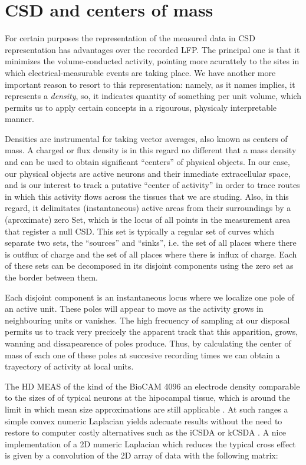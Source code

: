 \documentclass{article}
\begin{document}
\section{CSD and centers of mass}


For certain purposes the representation of the measured data in CSD
representation has advantages over the recorded LFP. The principal one is
that it minimizes the volume-conducted activity, pointing more acurattely
to the sites in which electrical-measurable events are taking place. We have
another more important reason to resort to this representation: namely,
as it names implies, it represents a \emph{density}, so, it indicates
quantity of something per unit volume, which permits us to apply certain
concepts in a rigourous, physicaly interpretable manner.

Densities are instrumental for taking vector averages, also known as centers
of mass. A charged or flux density is in this regard no different that a
mass density and can be used to obtain significant ``centers'' of
physical objects. In our case, our physical objects are active neurons and
their inmediate extracellular space, and is our interest to track a
putative ``center of activity'' in order to trace routes in which this
activity flows across the tissues that we are studing. Also, in this regard,
it delimitates (instantaneous) active areas from their surroundings by
a (aproximate) zero Set, which is the locus of all points in the measurement
area that register a null CSD. This set is typically a regular set of
curves which separate two sets, the ``sources'' and ``sinks'', i.e. the
set of all places where there is outflux of charge and the set of all places
where there is influx of charge. Each of these sets can be decomposed in
its disjoint components using the zero set as the border between them.

Each disjoint component is an instantaneous locus where we localize one pole of
an active unit. These poles will appear to move as the activity grows in neighbouring
units or vanishes. The high frecuency of sampling at our disposal permits us to
track very precicely the apparent track that this apparition, grows, wanning and
dissapearence of poles produce. Thus, by calculating the center of mass of
each one of these poles at succesive recording times
we can obtain a trayectory of activity at local units. 


The HD MEAS of the kind of the BioCAM 4096  an electrode density comparable
to the sizes of of typical neurons at the hipocampal tissue, which is around
the limit in which mean size approximations are still applicable \cite{Bedard2011}.
At such ranges a simple convex numeric Laplacian yields adecuate results without
the need to restore to computer costly alternatives such as the iCSDA or kCSDA
\cite{Leski2011, Potworowsky2011}. A nice implementation of a 2D numeric Laplacian
which reduces the typical cross effect is given by a convolution of
the 2D array of data with the following matrix:
\begin{equation}

\end{equation}
\end{document}
